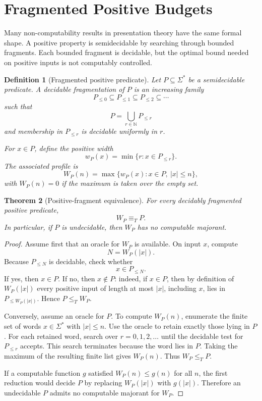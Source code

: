 \documentclass[11pt]{article}
\newtheorem{theorem}{Theorem}[section]
\newtheorem{definition}[theorem]{Definition}
\begin{document}
\section{Fragmented Positive Budgets}

Many non-computability results in presentation theory have the same formal shape. A positive property is semidecidable by searching through bounded fragments. Each bounded fragment is decidable, but the optimal bound needed on positive inputs is not computably controlled.

\begin{definition}[Fragmented positive predicate]
Let \(P\subseteq\Sigma^\ast\) be a semidecidable predicate. A decidable fragmentation of \(P\) is an increasing family
\[
P_{\leq0}\subseteq P_{\leq1}\subseteq P_{\leq2}\subseteq\cdots
\]
such that
\[
P=\bigcup_{r\in\mathbb N}P_{\leq r}
\]
and membership in \(P_{\leq r}\) is decidable uniformly in \(r\).

For \(x\in P\), define the positive width
\[
w_P(x)=\min\{r:x\in P_{\leq r}\}.
\]
The associated profile is
\[
W_P(n)=
\max\{w_P(x):x\in P,\ |x|\leq n\},
\]
with \(W_P(n)=0\) if the maximum is taken over the empty set.
\end{definition}

\begin{theorem}[Positive-fragment equivalence]
For every decidably fragmented positive predicate,
\[
W_P\equiv_T P.
\]
In particular, if \(P\) is undecidable, then \(W_P\) has no computable majorant.
\end{theorem}

\begin{proof}
Assume first that an oracle for \(W_P\) is available. On input \(x\), compute
\[
N=W_P(|x|).
\]
Because \(P_{\leq N}\) is decidable, check whether
\[
x\in P_{\leq N}.
\]
If yes, then \(x\in P\). If no, then \(x\notin P\): indeed, if \(x\in P\), then by definition of \(W_P(|x|)\) every positive input of length at most \(|x|\), including \(x\), lies in \(P_{\leq W_P(|x|)}\). Hence \(P\leq_T W_P\).

Conversely, assume an oracle for \(P\). To compute \(W_P(n)\), enumerate the finite set of words \(x\in\Sigma^\ast\) with \(|x|\leq n\). Use the oracle to retain exactly those lying in \(P\). For each retained word, search over \(r=0,1,2,\ldots\) until the decidable test for \(P_{\leq r}\) accepts. This search terminates because the word lies in \(P\). Taking the maximum of the resulting finite list gives \(W_P(n)\). Thus \(W_P\leq_T P\).

If a computable function \(g\) satisfied \(W_P(n)\leq g(n)\) for all \(n\), the first reduction would decide \(P\) by replacing \(W_P(|x|)\) with \(g(|x|)\). Therefore an undecidable \(P\) admits no computable majorant for \(W_P\).
\end{proof}
\end{document}
